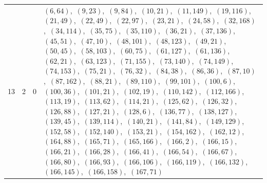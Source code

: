 \documentclass[11pt]{article}
\begin{document}
\begin{longtable}{@{}rrl>{\raggedright\arraybackslash}p{}@{}}
13 & 2 & $0$ & $(6,64)$,\allowbreak\ $(9,23)$,\allowbreak\ $(9,84)$,\allowbreak\ $(10,21)$,\allowbreak\ $(11,149)$,\allowbreak\ $(19,116)$,\allowbreak\ $(21,49)$,\allowbreak\ $(22,49)$,\allowbreak\ $(22,97)$,\allowbreak\ $(23,21)$,\allowbreak\ $(24,58)$,\allowbreak\ $(32,168)$,\allowbreak\ $(34,114)$,\allowbreak\ $(35,75)$,\allowbreak\ $(35,110)$,\allowbreak\ $(36,21)$,\allowbreak\ $(37,136)$,\allowbreak\ $(45,51)$,\allowbreak\ $(47,10)$,\allowbreak\ $(48,101)$,\allowbreak\ $(48,123)$,\allowbreak\ $(49,21)$,\allowbreak\ $(50,45)$,\allowbreak\ $(58,103)$,\allowbreak\ $(60,75)$,\allowbreak\ $(61,127)$,\allowbreak\ $(61,136)$,\allowbreak\ $(62,21)$,\allowbreak\ $(63,123)$,\allowbreak\ $(71,155)$,\allowbreak\ $(73,140)$,\allowbreak\ $(74,149)$,\allowbreak\ $(74,153)$,\allowbreak\ $(75,21)$,\allowbreak\ $(76,32)$,\allowbreak\ $(84,38)$,\allowbreak\ $(86,36)$,\allowbreak\ $(87,10)$,\allowbreak\ $(87,162)$,\allowbreak\ $(88,21)$,\allowbreak\ $(89,110)$,\allowbreak\ $(99,101)$,\allowbreak\ $(100,6)$,\allowbreak\ $(100,36)$,\allowbreak\ $(101,21)$,\allowbreak\ $(102,19)$,\allowbreak\ $(110,142)$,\allowbreak\ $(112,166)$,\allowbreak\ $(113,19)$,\allowbreak\ $(113,62)$,\allowbreak\ $(114,21)$,\allowbreak\ $(125,62)$,\allowbreak\ $(126,32)$,\allowbreak\ $(126,88)$,\allowbreak\ $(127,21)$,\allowbreak\ $(128,6)$,\allowbreak\ $(136,77)$,\allowbreak\ $(138,127)$,\allowbreak\ $(139,45)$,\allowbreak\ $(139,114)$,\allowbreak\ $(140,21)$,\allowbreak\ $(141,84)$,\allowbreak\ $(149,129)$,\allowbreak\ $(152,58)$,\allowbreak\ $(152,140)$,\allowbreak\ $(153,21)$,\allowbreak\ $(154,162)$,\allowbreak\ $(162,12)$,\allowbreak\ $(164,88)$,\allowbreak\ $(165,71)$,\allowbreak\ $(165,166)$,\allowbreak\ $(166,2)$,\allowbreak\ $(166,15)$,\allowbreak\ $(166,21)$,\allowbreak\ $(166,28)$,\allowbreak\ $(166,41)$,\allowbreak\ $(166,54)$,\allowbreak\ $(166,67)$,\allowbreak\ $(166,80)$,\allowbreak\ $(166,93)$,\allowbreak\ $(166,106)$,\allowbreak\ $(166,119)$,\allowbreak\ $(166,132)$,\allowbreak\ $(166,145)$,\allowbreak\ $(166,158)$,\allowbreak\ $(167,71)$\\

\end{longtable}
\end{document}
